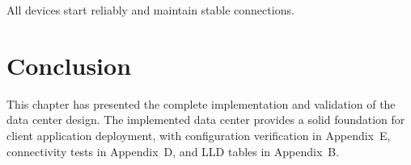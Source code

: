 All devices start reliably and maintain stable connections.

\section{Conclusion}
This chapter has presented the complete implementation and validation of the data center design. 
The implemented data center provides a solid foundation for client application deployment, with configuration verification in Appendix~E, connectivity tests in Appendix~D, and LLD tables in Appendix~B.